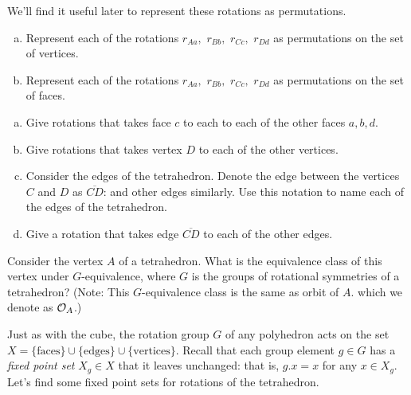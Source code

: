 \begin{exercise}\label{exercise:actions:tetra2}
We'll find it useful later to represent these rotations as permutations.
\begin{enumerate}[(a)] 
\item Represent each of the rotations $r_{Aa},$ $r_{Bb},$ $r_{Cc},$ $r_{Dd}$ as permutations on the set of vertices.
\item Represent each of the rotations $r_{Aa},$ $r_{Bb},$ $r_{Cc},$ $r_{Dd}$ as permutations on the set of faces.
\end{enumerate}
\end{exercise}
\begin{exercise}\label{exercise:actions:Tetra3}
\begin{enumerate}[(a)]
\item Give rotations that takes face $c$ to each to each of the other faces $a, b, d$.
\item Give rotations that takes vertex $D$ to each of the other vertices.
\item Consider the edges of the tetrahedron.  Denote the edge between the vertices $C$ and $D$ as $\overline{CD}$: and other edges similarly.  Use this notation to name each of the edges of the tetrahedron.
 \item Give a rotation that takes edge $\overline{CD}$ to each of the other edges.
\end{enumerate}
\end{exercise} 
\begin{exercise}\label{exercise:actions:Tetra4}
Consider the vertex $A$ of a tetrahedron.  What is the equivalence class of this vertex under $G$-equivalence, where $G$ is the groups of rotational symmetries of a tetrahedron?   (Note:  This $G$-equivalence class is the same as orbit of $A$. which we denote as ${\cal O}_A$.)
\end{exercise}


Just as with the cube, the rotation group $G$ of any polyhedron acts on the set $X=\{\text{faces}\}\cup\{\text{edges}\}\cup\{\text{vertices}\}$. Recall that each group element $g\in G$ has a \emph{fixed point set} $X_g\in X$ that it leaves unchanged: that is, $g.x=x$ for any $x\in X_g$. Let's find some fixed point sets for rotations of the tetrahedron.

